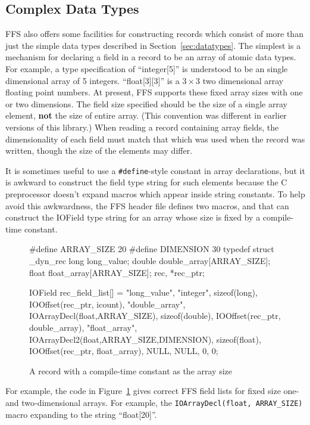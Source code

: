 \subsection{Complex Data Types}

FFS also offers some facilities for constructing records which consist of
more than just the simple data types described in Section~\ref{sec:datatypes}.
The simplest is a mechanism for declaring a field in a record to be an array
of atomic data types.  For example, a type specification of ``integer[5]'' is
understood to be an single dimensional array of 5 integers.  ``float[3][3]''
is a $3\times 3$ two dimensional array floating point numbers.  At present,
FFS supports these fixed array sizes with one or two dimensions.  The field
size specified should be the size of a single array element, {\bf not} the
size of entire array.  (This convention was different in earlier versions of
this library.)  When reading a record containing array fields, the
dimensionality of each field must match that which was used when the record
was written, though the size of the elements may differ.

It is sometimes useful to use a {\tt \#define}-style constant in array
declarations, but it is awkward to construct the field type string for such
elements because the C preprocessor doesn't expand macros which appear
inside string constants.  To help avoid this awkwardness, the FFS header
file defines two macros,  and
 that can construct the IOField type string for an
array whose size is fixed by a compile-time constant.  
\begin{figure}[b]
\begin{WrapCode}
#define ARRAY_SIZE 20
#define DIMENSION  30
typedef struct _dyn_rec {
    long        long_value;
    double      double_array[ARRAY_SIZE];
    float      float_array[ARRAY_SIZE];
} rec, *rec_ptr;

IOField rec_field_list[] = {
    {"long_value", "integer", sizeof(long), IOOffset(rec_ptr, icount)},
    {"double_array", IOArrayDecl(float,ARRAY_SIZE), sizeof(double), IOOffset(rec_ptr, double_array)},
    {"float_array", IOArrayDecl2(float,ARRAY_SIZE,DIMENSION), sizeof(float), IOOffset(rec_ptr, float_array)},
    { NULL, NULL, 0, 0}};
\end{WrapCode}
\caption{A record with a compile-time constant as the array size\label{fig:fixarray}}
\end{figure}
For example, the code
in Figure~\ref{fig:fixarray} gives correct FFS field lists for fixed size
one- and two-dimensional arrays.  For example, the {\tt IOArrayDecl(float,
ARRAY\_SIZE)} macro expanding to the string ``float[20]''.



